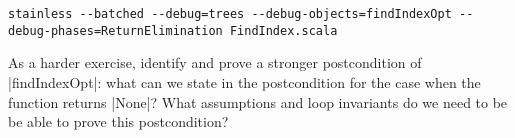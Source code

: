 \begin{lstlisting}
stainless --batched --debug=trees --debug-objects=findIndexOpt --debug-phases=ReturnElimination FindIndex.scala
\end{lstlisting}

As a harder exercise, identify and prove a stronger postcondition of |findIndexOpt|:
what can we state in the postcondition for the case when the function returns |None|?
What assumptions and loop invariants do we need to be be able to prove this postcondition?

